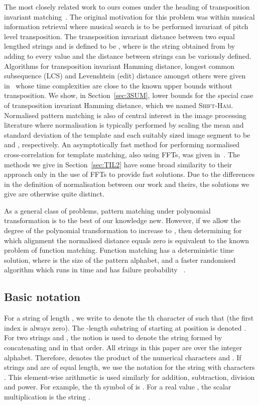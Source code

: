\documentclass[11pt]{article}
\newcommand{\sHam}{\textsc{Shift-Ham}\xspace}
\newcommand{\margin}[1]{}
\theoremstyle{plain}
\theoremstyle{definition}
\begin{document}
The most closely related work to ours comes under the heading of transposition invariant matching~\cite{LU:2000}.  The original motivation for this problem was within musical information retrieval where musical search is to be performed invariant of pitch level transposition. The transposition invariant distance between two equal lengthed strings  and  is defined to be , where  is the string obtained from  by adding  to every value and the distance  between strings can be variously defined.  Algorithms for transposition invariant Hamming distance, longest common subsequence (LCS) and Levenshtein (edit) distance amongst others were given in~\cite{MNU:2005} whose time complexities are close to the known upper bounds without transposition.   We show, in Section~\ref{sec:3SUM}, lower bounds for the special case of transposition invariant Hamming distance, which we named \sHam. Normalised pattern matching is also of central interest in the image processing literature where normalisation is typically performed by scaling the mean and standard deviation of the template and each suitably sized image segment to be  and , respectively. An asymptotically fast method for performing normalised cross-correlation for template matching, also using FFTs, was given in~\cite{Lewis:1995}.  The methods we give in Section~\ref{sec:TIL2} have some broad similarity to their approach only in the use of FFTs to provide fast solutions. Due to the differences in the definition of normalisation between our work and theirs, the solutions we give are otherwise quite distinct.




As a general class of problems, pattern matching under polynomial transformation is to the best of our knowledge new.  However, if we allow the degree of the polynomial transformation to increase to , then determining for which alignment the normalised distance equals zero is equivalent to the known problem of function matching.  Function matching has a deterministic  time solution, where  is the size of the pattern alphabet, and a faster randomised algorithm which runs in  time and has failure probability ~\cite{AALP:2006}.  \margin{Higher degree: Add relationship to our higher degree result when it exists.}




\subsection{Basic notation}

For a string  of length , we write  to denote the th character of  such that  (the first index is always zero). The -length substring of  starting at position  is denoted . For two strings  and , the notion  is used to denote the string formed by concatenating  and  in that order. All strings in this paper are over the integer alphabet. Therefore,  denotes the product of the numerical characters  and . If strings  and  are of equal length, we use the notation  for the string with characters . This element-wise arithmetic is used similarly for addition, subtraction, division and power. For example, the th symbol of  is . For a real value , the scalar multiplication  is the string .
\end{document}
